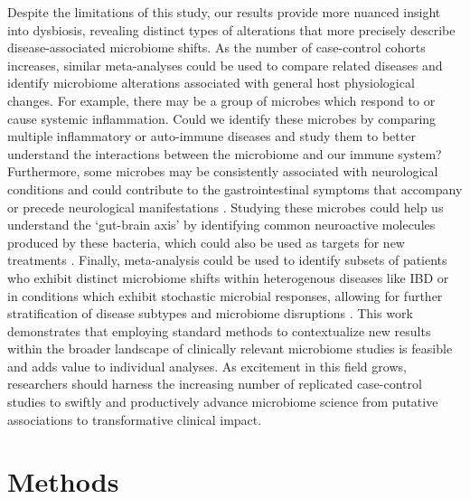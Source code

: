Despite the limitations of this study, our results provide more nuanced insight into dysbiosis, revealing distinct types of alterations that more precisely describe disease-associated microbiome shifts.
As the number of case-control cohorts increases, similar meta-analyses could be used to compare related diseases and identify microbiome alterations associated with general host physiological changes.
For example, there may be a group of microbes which respond to or cause systemic inflammation.
Could we identify these microbes by comparing multiple inflammatory or auto-immune diseases and study them to better understand the interactions between the microbiome and our immune system?
Furthermore, some microbes may be consistently associated with neurological conditions and could contribute to the gastrointestinal symptoms that accompany or precede neurological manifestations \cite{asd-kb,par-schep}.
Studying these microbes could help us understand the `gut-brain axis' by identifying common neuroactive molecules produced by these bacteria, which could also be used as targets for new treatments \cite{Hsiao2013gutbrain,Cryan2012gutbrain,Poutahidis2013gutbrain}.
Finally, meta-analysis could be used to identify subsets of patients who exhibit distinct microbiome shifts within heterogenous diseases like IBD or in conditions which exhibit stochastic microbial responses, allowing for further stratification of disease subtypes and microbiome disruptions \cite{zaneveld2017karenina,ibd-engstrand,Pascal2017crohns}.
This work demonstrates that employing standard methods to contextualize new results within the broader landscape of clinically relevant microbiome studies is feasible and adds value to individual analyses.
As excitement in this field grows, researchers should harness the increasing number of replicated case-control studies to swiftly and productively advance microbiome science from putative associations to transformative clinical impact.


\section*{Methods}

